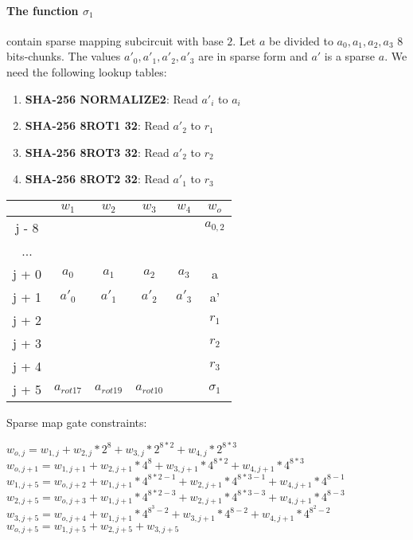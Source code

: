 \paragraph{The function $\sigma_1$} contain sparse mapping subcircuit with base $2$.
Let $a$ be divided to $a_0, a_1, a_2, a_3$ 8 bits-chunks.
The values $a'_0, a'_1, a'_2, a'_3$ are in sparse form and $a'$ is a sparse $a$.
We need the following lookup tables:
\begin{enumerate}
\item \textbf{SHA-256 NORMALIZE2}: Read $a'_i$ to $a_i$
\item \textbf{SHA-256 8ROT1 32}: Read $a'_2$ to $r_1$
\item \textbf{SHA-256 8ROT3 32}: Read $a'_2$ to $r_2$ 
\item \textbf{SHA-256 8ROT2 32}: Read $a'_1$ to $r_3$ 
\end{enumerate}
\begin{center}
\begin{tabular}{ |c|c|c|c|c|c } 
  & $w_1$ & $w_2$ & $w_3$ & $w_4$ & $w_o$\\ 
 \hline
j - 8 &  &  &  &  & $a_{0, 2}$\\ 
... &&&&& \\
j + 0 & $a_0$ & $ a_1$ & $a_2$ & $a_3$ & a\\ 
j + 1 & $a'_0$ & $a'_1$ & $a'_2$ & $a'_3$ & a' \\ 
j + 2 & &  &  &  & $r_1$ \\
j + 3 & &  &  &  & $r_2 $ \\ 
j + 4 & &  &  &  & $r_3 $ \\ 
j + 5 & $a_{rot17} $& $a_{rot19}$ & $a_{rot10}$ &  & $\sigma_1$ \\ 
 \hline
\end{tabular}
\end{center}
Sparse map gate constraints:
\begin{center}
$w_{o,j} = w_{1,j} + w_{2,j}*2^8 + w_{3,j}*2^{8*2} + w_{4,j}*2^{8*3}$ \\
$w_{o,j+1} = w_{1,j+1} + w_{2,j+1}*4^8 + w_{3,j+1}*4^{8*2} + w_{4,j+1}*4^{8*3}$ \\
$w_{1,j+5} = w_{o,j+2} + w_{1,j+1}*4^{8*2-1} + w_{2,j+1}*4^{8*3-1} + w_{4,j+1}*4^{8 - 1}$ \\
$w_{2,j+5} = w_{o,j+3} + w_{1,j+1}*4^{8*2-3} + w_{2,j+1}*4^{8*3-3} + w_{4,j+1}*4^{8 - 3}$ \\
$w_{3,j+5} = w_{o,j+4} + w_{1,j+1}*4^{8^3-2} + w_{3,j+1}*4^{8-2} + w_{4,j+1}*4^{8^2- 2}$ \\
$w_{o, j+5} = w_{1,j+5} + w_{2, j+5} + w_{3, j+5}$ \\
\end{center}

